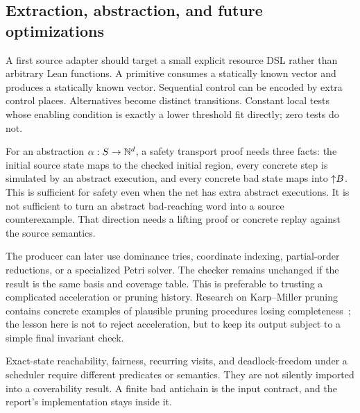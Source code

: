 \subsection{Extraction, abstraction, and future optimizations}
A first source adapter should target a small explicit resource DSL rather than arbitrary Lean functions. A primitive consumes a statically known vector and produces a statically known vector. Sequential control can be encoded by extra control places. Alternatives become distinct transitions. Constant local tests whose enabling condition is exactly a lower threshold fit directly; zero tests do not.

For an abstraction $\alpha:S\to\mathbb N^d$, a safety transport proof needs three facts: the initial source state maps to the checked initial region, every concrete step is simulated by an abstract execution, and every concrete bad state maps into $\mathord{\uparrow}B$. This is sufficient for safety even when the net has extra abstract executions. It is not sufficient to turn an abstract bad-reaching word into a source counterexample. That direction needs a lifting proof or concrete replay against the source semantics.

The producer can later use dominance tries, coordinate indexing, partial-order reductions, or a specialized Petri solver. The checker remains unchanged if the result is the same basis and coverage table. This is preferable to trusting a complicated acceleration or pruning history. Research on Karp--Miller pruning contains concrete examples of plausible pruning procedures losing completeness~\cite{reynier-servais}; the lesson here is not to reject acceleration, but to keep its output subject to a simple final invariant check.

Exact-state reachability, fairness, recurring visits, and deadlock-freedom under a scheduler require different predicates or semantics. They are not silently imported into a coverability result. A finite bad antichain is the input contract, and the report's implementation stays inside it.
